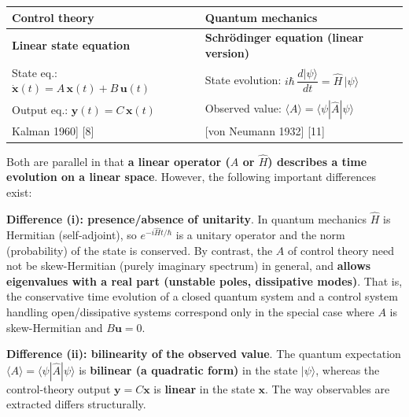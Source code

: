\documentclass[
]{article}
\newcounter{none} %
\begin{document}
{\def\LTcaptype{none} %
\begin{longtable}[]{@{}
  >{\raggedright\arraybackslash}p{}
  >{\raggedright\arraybackslash}p{}@{}}
\toprule\noalign{}
\begin{minipage}[b]{\linewidth}\raggedright
Control theory
\end{minipage} & \begin{minipage}[b]{\linewidth}\raggedright
Quantum mechanics
\end{minipage} \\
\midrule\noalign{}
\endhead
\bottomrule\noalign{}
\endlastfoot
\textbf{Linear state equation} & \textbf{Schrödinger equation (linear
version)} \\
State eq.: \(\dot{\mathbf{x}}(t) = A\,\mathbf{x}(t) + B\,\mathbf{u}(t)\)
& State evolution:
\(i\hbar\,\dfrac{d|\psi\rangle}{dt} = \hat{H}\,|\psi\rangle\) \\
Output eq.: \(\mathbf{y}(t) = C\,\mathbf{x}(t)\) & Observed value:
\(\langle A\rangle = \langle\psi|\hat{A}|\psi\rangle\) \\
{[}Kalman 1960{]} {[}8{]} & {[}von Neumann 1932{]} {[}11{]} \\
\end{longtable}
}

Both are parallel in that \textbf{a linear operator (\(A\) or
\(\hat{H}\)) describes a time evolution on a linear space}. However, the
following important differences exist:

\textbf{Difference (i): presence/absence of unitarity}. In quantum
mechanics \(\hat{H}\) is Hermitian (self-adjoint), so
\(e^{-i\hat{H}t/\hbar}\) is a unitary operator and the norm
(probability) of the state is conserved. By contrast, the \(A\) of
control theory need not be skew-Hermitian (purely imaginary spectrum) in
general, and \textbf{allows eigenvalues with a real part (unstable
poles, dissipative modes)}. That is, the conservative time evolution of
a closed quantum system and a control system handling open/dissipative
systems correspond only in the special case where \(A\) is
skew-Hermitian and \(B\mathbf{u}=0\).

\textbf{Difference (ii): bilinearity of the observed value}. The quantum
expectation \(\langle A\rangle=\langle\psi|\hat{A}|\psi\rangle\) is
\textbf{bilinear (a quadratic form)} in the state \(|\psi\rangle\),
whereas the control-theory output \(\mathbf{y}=C\mathbf{x}\) is
\textbf{linear} in the state \(\mathbf{x}\). The way observables are
extracted differs structurally.
\end{document}
